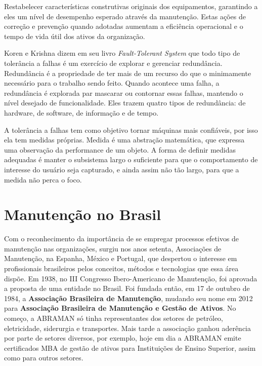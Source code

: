Restabelecer características construtivas originais dos equipamentos, garantindo a eles um nível de desempenho esperado através da manutenção. 
Estas ações de correção e prevenção quando adotadas aumentam a eficiência operacional e o tempo de vida útil dos ativos da organização. 

Koren e Krishna \cite{koren2007} dizem em seu livro \emph{Fault-Tolerant System} que todo tipo de tolerância a falhas é um exercício de explorar e gerenciar redundância. Redundância é a propriedade de ter mais de um recurso do que o minimamente necessário para o trabalho sendo feito. Quando acontece uma falha, a redundância é explorada par mascarar ou contornar essas falhas, mantendo o nível desejado de funcionalidade. Eles trazem quatro tipos de redundância: de hardware, de software, de informação e de tempo.  

A tolerância a falhas tem como objetivo tornar máquinas mais confiáveis, por isso ela tem medidas próprias. Medida é uma abstração matemática, que expressa uma observação da performance de um objeto. A forma de definir medidas adequadas é manter o subsistema largo o suficiente para que o comportamento de interesse do usuário seja capturado, e ainda assim não tão largo, para que a medida não perca o foco.


\section{Manutenção no Brasil}

Com o reconhecimento da importância de se empregar processos efetivos de manutenção nas organizações, surgiu nos anos setenta, Associações de Manutenção, na Espanha, México e Portugal, que despertou o interesse em profissionais brasileiros pelos conceitos, métodos e tecnologias que essa área dispõe. Em 1938, no III Congresso Ibero-Americano de Manutenção, foi aprovada a proposta de uma entidade no Brasil. Foi fundada então, em 17 de outubro de 1984, a \textbf{Associação Brasileira de Manutenção}, mudando seu nome em 2012 para \textbf{Associação Brasileira de Manutenção e Gestão de Ativos}. No começo, a ABRAMAN só tinha representantes dos setores de petróleo, eletricidade, siderurgia e transportes. Mais tarde a associação ganhou aderência por parte de setores diversos, por exemplo, hoje em dia a ABRAMAN emite certificados MBA de gestão de ativos para Instituições de Ensino Superior, assim como para outros setores. 

